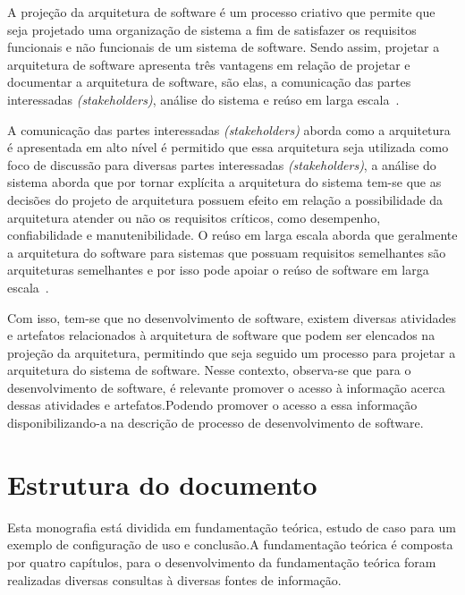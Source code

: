 A projeção da arquitetura de software é um processo criativo que permite que seja projetado uma organização de sistema a fim de satisfazer os requisitos funcionais e não funcionais de um sistema de software. Sendo assim, projetar a arquitetura de software apresenta três vantagens em relação de projetar e documentar a arquitetura de software, são elas, a comunicação das partes interessadas \emph{(stakeholders)}, análise do sistema e reúso em larga escala~\cite{Sommerville_2011_texbook}.

A comunicação das partes interessadas \emph{(stakeholders)} aborda como a arquitetura é apresentada em alto nível é permitido que essa arquitetura seja utilizada como foco de discussão para diversas partes interessadas \emph{(stakeholders)}, a análise do sistema aborda que por tornar explícita a arquitetura do sistema tem-se que as decisões do projeto de arquitetura possuem efeito em relação a possibilidade da arquitetura atender ou não os requisitos críticos, como desempenho, confiabilidade e manutenibilidade. O reúso em larga escala aborda que geralmente a arquitetura do software para sistemas que possuam requisitos semelhantes são arquiteturas semelhantes e por isso pode apoiar o reúso de software em larga escala~\cite{Sommerville_2011_texbook}.

Com isso, tem-se que no desenvolvimento de software, existem diversas atividades e artefatos relacionados à arquitetura de software que podem ser elencados na projeção da arquitetura, permitindo que seja seguido um processo para projetar a arquitetura do sistema de software. Nesse contexto, observa-se que para o desenvolvimento de software, é relevante promover o acesso à informação acerca dessas atividades e artefatos.Podendo promover o acesso a essa informação disponibilizando-a na descrição de processo de desenvolvimento de software.

\section{Estrutura do documento}

Esta monografia está dividida em fundamentação teórica, estudo de caso para um exemplo de configuração de uso e conclusão.A fundamentação teórica é composta por quatro capítulos, para o desenvolvimento da fundamentação teórica foram realizadas diversas consultas à diversas fontes de informação.

